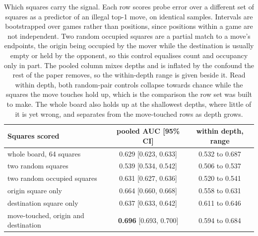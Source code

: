 \begin{table}[t]
\centering\small
\caption{Which squares carry the signal. Each row scores probe error
over a different set of squares as a predictor of an illegal top-1 move,
on identical samples. Intervals are bootstrapped over games rather than
positions, since positions within a game are not independent. Two random
occupied squares are a partial match to a move's endpoints, the origin being
occupied by the mover while the destination is usually empty or held by the
opponent, so this control equalises count and occupancy only in part. The
pooled column mixes depths and is inflated by the confound the rest of the
paper removes, so the within-depth range is given beside it. Read within
depth, both random-pair controls collapse towards chance while the squares
the move touches hold up, which is the comparison the row set was built to
make. The whole board also holds up at the shallowest depths, where little
of it is yet wrong, and separates from the move-touched rows as depth
grows.}
\label{tab:sqcontrol}
\begin{tabular}{lcc}
\toprule
Squares scored & pooled AUC [95\% CI] & within depth, range \\
\midrule
whole board, 64 squares & 0.629 [0.623, 0.633] & 0.532 to 0.687 \\
two random squares & 0.539 [0.534, 0.542] & 0.506 to 0.537 \\
two random occupied squares & 0.631 [0.627, 0.636] & 0.520 to 0.541 \\
origin square only & 0.664 [0.660, 0.668] & 0.558 to 0.631 \\
destination square only & 0.637 [0.633, 0.642] & 0.611 to 0.646 \\
move-touched, origin and destination & \textbf{0.696} [0.693, 0.700] & 0.594 to 0.684 \\
\bottomrule
\end{tabular}
\end{table}
